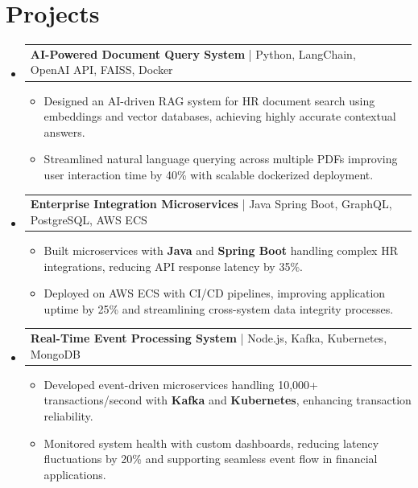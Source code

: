 \documentclass[letterpaper,11pt]{article}
\makeatletter
\newcommand{\resumeItem}[1]{
  \item\footnotesize{
    {#1 \vspace{-2pt}}
  }
}
\newcommand{\resumeProjectHeading}[2]{
    \item
    \begin{tabular*}{1.001\textwidth}{l@{\extracolsep{\fill}}r}
      \small#1 & \textbf{\small #2}\\
    \end{tabular*}\vspace{-7pt}
}
\newcommand{\resumeSubHeadingListStart}{\begin{itemize}[leftmargin=0pt, label={}]}
\newcommand{\resumeSubHeadingListEnd}{\end{itemize}}
\newcommand{\resumeItemListStart}{\begin{itemize}[leftmargin=*]}
\newcommand{\resumeItemListEnd}{\end{itemize}\vspace{-5pt}}
\makeatother
\begin{document}
\section{Projects}
    \vspace{-5pt}
    \resumeSubHeadingListStart

      \resumeProjectHeading
          {\textbf{AI-Powered Document Query System} | Python, LangChain, OpenAI API, FAISS, Docker}{ }
        \resumeItemListStart
            \resumeItem{Designed an AI-driven RAG system for HR document search using embeddings and vector databases, achieving highly accurate contextual answers.}
            \resumeItem{Streamlined natural language querying across multiple PDFs improving user interaction time by 40\% with scalable dockerized deployment.}
        \resumeItemListEnd
        \vspace{-12pt}

      \resumeProjectHeading
          {\textbf{Enterprise Integration Microservices} | Java Spring Boot, GraphQL, PostgreSQL, AWS ECS}{ }
        \resumeItemListStart
            \resumeItem{Built microservices with \textbf{Java} and \textbf{Spring Boot} handling complex HR integrations, reducing API response latency by 35\%.}
            \resumeItem{Deployed on AWS ECS with CI/CD pipelines, improving application uptime by 25\% and streamlining cross-system data integrity processes.}
        \resumeItemListEnd
        \vspace{-12pt}

      \resumeProjectHeading
          {\textbf{Real-Time Event Processing System} | Node.js, Kafka, Kubernetes, MongoDB}{ }
        \resumeItemListStart
            \resumeItem{Developed event-driven microservices handling 10,000+ transactions/second with \textbf{Kafka} and \textbf{Kubernetes}, enhancing transaction reliability.}
            \resumeItem{Monitored system health with custom dashboards, reducing latency fluctuations by 20\% and supporting seamless event flow in financial applications.}
        \resumeItemListEnd

    \resumeSubHeadingListEnd
\end{document}
